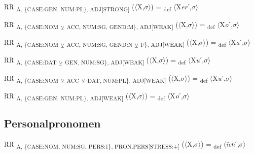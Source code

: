 {\begin{exe}
 RR \textsubscript{A, \{CASE:GEN, NUM:PL\}, ADJ[STRONG]} ($\langle$X,$\sigma $$\rangle$) = \textsubscript{def} $\langle$X\textit{er}ˊ,$\sigma $$\rangle$
\end{exe}

\begin{exe}
 RR \textsubscript{A, \{CASE:NOM} \textsubscript{${\veebar}$}\textsubscript{ ACC, NUM:SG, GEND:M\}, ADJ[WEAK]} ($\langle$X,$\sigma $$\rangle$) = \textsubscript{def} $\langle$X\textit{o}ˊ,$\sigma $$\rangle$
\end{exe}

\begin{exe}
 RR \textsubscript{A, \{CASE:NOM} \textsubscript{${\veebar}$}\textsubscript{ ACC, NUM:SG, GEND:N} \textsubscript{${\veebar}$}\textsubscript{ F\}, ADJ[WEAK]} ($\langle$X,$\sigma $$\rangle$) = \textsubscript{def} $\langle$X\textit{a}ˊ,$\sigma $$\rangle$
\end{exe}

\begin{exe}
 RR \textsubscript{A, \{CASE:DAT} \textsubscript{${\veebar}$}\textsubscript{ GEN, NUM:SG\}, ADJ[WEAK]} ($\langle$X,$\sigma $$\rangle$) = \textsubscript{def} $\langle$X\textit{u}ˊ,$\sigma $$\rangle$
\end{exe}

\begin{exe}
 RR \textsubscript{A, \{CASE:NOM} \textsubscript{${\veebar}$}\textsubscript{ ACC} \textsubscript{${\veebar}$} \textsubscript{DAT, NUM:PL\}, ADJ[WEAK]} ($\langle$X,$\sigma $$\rangle$) = \textsubscript{def} $\langle$X\textit{u}ˊ,$\sigma $$\rangle$
\end{exe}

\begin{exe}
 RR \textsubscript{A, \{CASE:GEN, NUM:PL\}, ADJ[WEAK]} ($\langle$X,$\sigma $$\rangle$) = \textsubscript{def} $\langle$X\textit{o}ˊ,$\sigma $$\rangle$
\end{exe}

\subsection{Personalpronomen}

\begin{exe}
 RR \textsubscript{A, \{CASE:NOM, NUM:SG, PERS:1\}, PRON.PERS[STRESS:+]} ($\langle$X,$\sigma $$\rangle$) = \textsubscript{def} $\langle$\textit{\=ich}ˊ,$\sigma $$\rangle$
\end{exe}

}
